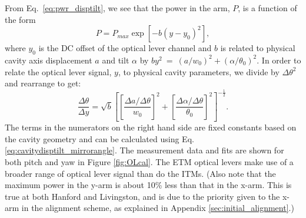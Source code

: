 From Eq.~\ref{eq:pwr_disptilt}, we see that the power in the arm, $P$,
is a function of the form 
\begin{equation}
P = P_{max} \exp{[-b (y-y_0)^2]},
\label{eq:OLcalfit}
\end{equation}
where $y_0$ is the DC offset of the optical lever channel and $b$ is
related to physical cavity axis displacement $a$ and tilt $\alpha$ by
$by^2~=~(a/w_0)^2+(\alpha/\theta_0)^2$. In order to relate the optical
lever signal, $y$, to physical cavity parameters, we divide by
$\Delta{\theta}^2$ and rearrange to get:
\begin{equation}
\frac{\Delta \theta}{\Delta y} = \sqrt{b} \left[
  \left[\frac{\Delta a/\Delta\theta}{w_0}\right]^2 +
  \left[\frac{\Delta\alpha/\Delta\theta}{\theta_0}\right]^2
\right]^{-\frac{1}{2}} .
\end{equation}
The terms in the numerators on the right hand side are fixed constants
based on the cavity geometry and can be calculated using
Eq. \ref{eq:cavitydisptilt_mirrorangle}. The measurement data and fits
are shown for both pitch and yaw in Figure \ref{fig:OLcal}. The ETM
optical levers make use of a broader range of optical lever signal
than do the ITMs. (Also note that the maximum power in the y-arm is about
10\% less than that in the x-arm. This is true at both Hanford and
Livingston, and is due to the priority given to the x-arm in the
alignment scheme, as explained in Appendix
\ref{sec:initial_alignment}.)

